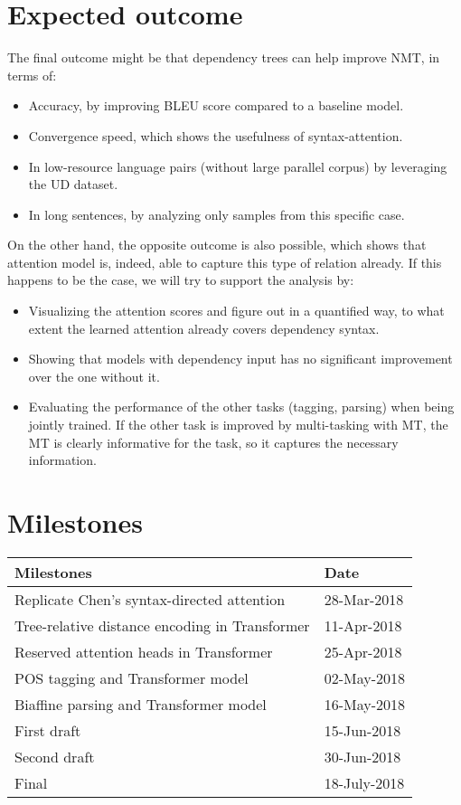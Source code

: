 \documentclass{article}
\begin{document}
\section{Expected outcome}
The final outcome might be that dependency trees can help improve NMT, in terms of:

\begin{itemize}
    \item Accuracy, by improving BLEU score compared to a baseline model.
    \item Convergence speed, which shows the usefulness of syntax-attention.
    \item In low-resource language pairs (without large parallel corpus) by leveraging the UD dataset.
    \item In long sentences, by analyzing only samples from this specific case.
\end{itemize}

On the other hand, the opposite outcome is also possible, which shows that attention model is, indeed, able to capture this type of relation already. If this happens to be the case, we will try to support the analysis by:
\begin{itemize}
    \item Visualizing the attention scores and figure out in a quantified way, to what extent the learned attention already covers dependency syntax.
    \item Showing that models with dependency input has no significant improvement over the one without it.
    \item Evaluating the performance of the other tasks (tagging, parsing) when being jointly trained. If the other task is improved by multi-tasking with MT, the MT is clearly informative for the task, so it captures the necessary information.
\end{itemize}


\section{Milestones}
\begin{center}
\begin{tabular}{l | l} 
    \textbf{Milestones} & \textbf{Date} \\
    \hline
    Replicate Chen's syntax-directed attention & 28-Mar-2018 \\
    Tree-relative distance encoding in Transformer & 11-Apr-2018 \\
    Reserved attention heads in Transformer & 25-Apr-2018 \\
    \hline
    POS tagging and Transformer model & 02-May-2018 \\
    Biaffine parsing and Transformer model & 16-May-2018 \\
    \hline
    First draft & 15-Jun-2018 \\
    Second draft & 30-Jun-2018 \\
    Final & 18-July-2018 \\
\end{tabular}
\end{center}



\end{document}
